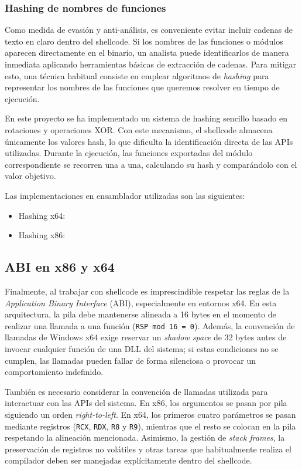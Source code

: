 \subsubsection{Hashing de nombres de funciones}

Como medida de evasión y anti-análisis, es conveniente evitar incluir cadenas de texto en claro dentro del shellcode. Si los nombres de las funciones o módulos aparecen directamente en el binario, un analista puede identificarlos de manera inmediata aplicando herramientas básicas de extracción de cadenas. Para mitigar esto, una técnica habitual consiste en emplear algoritmos de \textit{hashing} para representar los nombres de las funciones que queremos resolver en tiempo de ejecución.

En este proyecto se ha implementado un sistema de hashing sencillo basado en rotaciones y operaciones XOR. Con este mecanismo, el shellcode almacena únicamente los valores hash, lo que dificulta la identificación directa de las APIs utilizadas. Durante la ejecución, las funciones exportadas del módulo correspondiente se recorren una a una, calculando su hash y comparándolo con el valor objetivo.

Las implementaciones en ensamblador utilizadas son las siguientes:

\begin{itemize}
    \item Hashing x64: \cite{x64_hash}
    \item Hashing x86: \cite{x86_hash}
\end{itemize}

\subsection{ABI en x86 y x64}

Finalmente, al trabajar con shellcode es imprescindible respetar las reglas de la \textit{Application Binary Interface} (ABI), especialmente en entornos x64. En esta arquitectura, la pila debe mantenerse alineada a 16 bytes en el momento de realizar una llamada a una función (\texttt{RSP mod 16 = 0}). Además, la convención de llamadas de Windows x64 exige reservar un \textit{shadow space} de 32 bytes antes de invocar cualquier función de una DLL del sistema; si estas condiciones no se cumplen, las llamadas pueden fallar de forma silenciosa o provocar un comportamiento indefinido.

También es necesario considerar la convención de llamadas utilizada para interactuar con las APIs del sistema. En x86, los argumentos se pasan por pila siguiendo un orden \textit{right-to-left}. En x64, los primeros cuatro parámetros se pasan mediante registros (\texttt{RCX}, \texttt{RDX}, \texttt{R8} y \texttt{R9}), mientras que el resto se colocan en la pila respetando la alineación mencionada. Asimismo, la gestión de \textit{stack frames}, la preservación de registros no volátiles y otras tareas que habitualmente realiza el compilador deben ser manejadas explícitamente dentro del shellcode.

